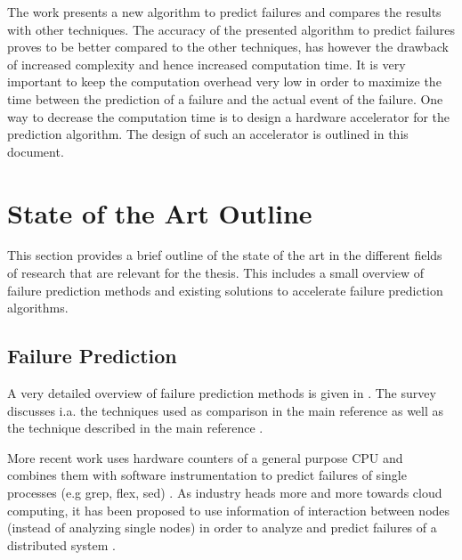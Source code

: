 \documentclass[12pt]{article} %
\begin{document}
The work presents a new algorithm to predict failures and compares the results
with other techniques. The accuracy of the presented algorithm to predict
failures proves to be better compared to the other techniques, has however the
drawback of increased complexity and hence increased computation time. It is
very important to keep the computation overhead very low in order to maximize
the time between the prediction of a failure and the actual event of the
failure. One way to decrease the computation time is to design a hardware
accelerator for the prediction algorithm. The design of such an accelerator is
outlined in this document.


\section{State of the Art Outline} %

This section provides a brief outline of the state of the art in the different
fields of research that are relevant for the thesis. This includes a small
overview of failure prediction methods and existing solutions to accelerate
failure prediction algorithms.


\subsection{Failure Prediction} %

A very detailed overview of failure prediction methods is given in
\cite{ACM10_Salfner}. The survey discusses i.a. the techniques used as
comparison in the main reference
\cite{lin88,IEEE90_lin,ICDM02_Vilalta,domeniconi02} as well as the technique
described in the main reference \cite{salfner08}.

More recent work uses hardware counters of a general purpose CPU and combines
them with software instrumentation to predict failures of single processes (e.g
grep, flex, sed) \cite{FSE10_Yilmaz,ozcelik14}. As industry heads more and more
towards cloud computing, it has been proposed to use information of interaction
between nodes (instead of analyzing single nodes) in order to analyze and
predict failures of a distributed system \cite{IEEE12_Salfner,DSN10_Oliner}.
\end{document}

